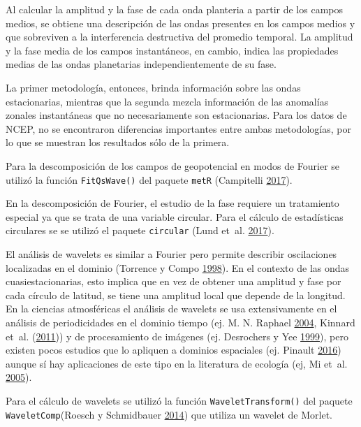 \documentclass[spanish,a4paper,12p]{book}
\begin{document}
Al calcular la amplitud y la fase de cada onda planteria a partir de los
campos medios, se obtiene una descripción de las ondas presentes en los
campos medios y que sobreviven a la interferencia destructiva del
promedio temporal. La amplitud y la fase media de los campos
instantáneos, en cambio, indica las propiedades medias de las ondas
planetarias independientemente de su fase.

La primer metodología, entonces, brinda información sobre las ondas
estacionarias, mientras que la segunda mezcla información de las
anomalías zonales instantáneas que no necesariamente son estacionarias.
Para los datos de NCEP, no se encontraron diferencias importantes entre
ambas metodologías, por lo que se muestran los resultados sólo de la
primera.

Para la descomposición de los campos de geopotencial en modos de Fourier
se utilizó la función \texttt{FitQsWave()} del paquete \texttt{metR}
(Campitelli \protect\hyperlink{ref-R-metR}{2017}).

En la descomposición de Fourier, el estudio de la fase requiere un
tratamiento especial ya que se trata de una variable circular. Para el
cálculo de estadísticas circulares se se utilizó el paquete
\texttt{circular} (Lund et~al.
\protect\hyperlink{ref-R-circular}{2017}).

El análisis de wavelets es similar a Fourier pero permite describir
oscilaciones localizadas en el dominio (Torrence y Compo
\protect\hyperlink{ref-Torrence1998}{1998}). En el contexto de las ondas
cuasiestacionarias, esto implica que en vez de obtener una amplitud y
fase por cada círculo de latitud, se tiene una amplitud local que
depende de la longitud. En la ciencias atmosféricas el análisis de
wavelets se usa extensivamente en el análisis de periodicidades en el
dominio tiempo (ej. M. N. Raphael
\protect\hyperlink{ref-Raphael2004}{2004}, Kinnard et~al.
(\protect\hyperlink{ref-Kinnard2011}{2011})) y de procesamiento de
imágenes (ej. Desrochers y Yee
\protect\hyperlink{ref-Desrochers1999}{1999}), pero existen pocos
estudios que lo apliquen a dominios espaciales (ej. Pinault
\protect\hyperlink{ref-Pinault2016}{2016}) aunque sí hay aplicaciones de
este tipo en la literatura de ecología (ej, Mi et~al.
\protect\hyperlink{ref-Mi2005}{2005}).

Para el cálculo de wavelets se utilizó la función
\texttt{WaveletTransform()} del paquete \texttt{WaveletComp}(Roesch y
Schmidbauer \protect\hyperlink{ref-R-WaveletComp}{2014}) que utiliza un
wavelet de Morlet.
\end{document}
